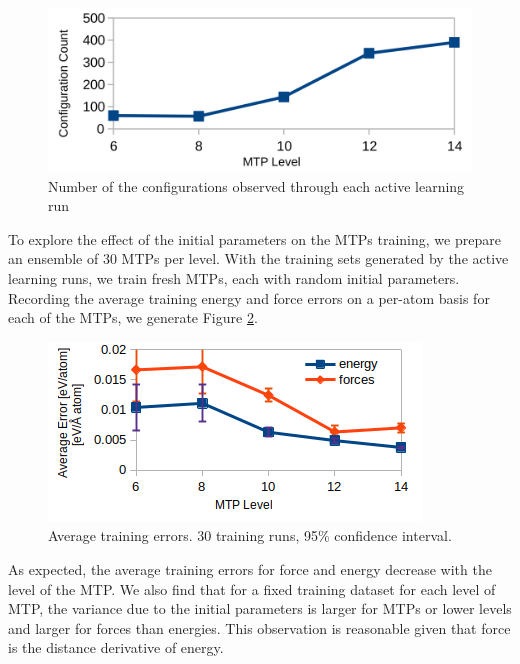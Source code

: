 \documentclass[9pt,twocolumn,twoside]{opticajnl}
\begin{document}
\begin{figure}[ht]
  \centering
  \includegraphics[width=\linewidth]{assets/levels.png}
  \caption{Number of the configurations observed through each active learning run }
  \label{fig:levels}
\end{figure}

To explore the effect of the initial parameters on the MTPs training, we prepare an ensemble of 30 MTPs per level. With the training sets generated by the active learning runs, we train fresh MTPs, each with random initial parameters. Recording the average training energy and force errors on a per-atom basis for each of the MTPs, we generate Figure \ref{fig:errors}. 

\begin{figure}[ht]
  \centering
  \includegraphics[width=\linewidth]{assets/errors.png}
  \caption{Average training errors. 30 training runs, 95\% confidence interval.}
  \label{fig:errors}
\end{figure}

As expected, the average training errors for force and energy decrease with the level of the MTP. We also find that for a fixed training dataset for each level of MTP, the variance due to the initial parameters is larger for MTPs or lower levels and larger for forces than energies. This observation is reasonable given that force is the distance derivative of energy. 
\end{document}
